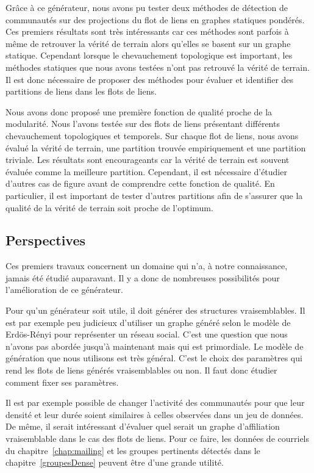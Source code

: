 \bigskip

Grâce à ce générateur, nous avons pu tester deux méthodes de détection de communautés sur des projections du flot de liens en graphes statiques pondérés.
Ces premiers résultats sont très intéressants car ces méthodes sont parfois à même de retrouver la vérité de terrain alors qu'elles se basent sur un graphe statique.
Cependant lorsque le chevauchement topologique est important, les méthodes statiques que nous avons testées n'ont pas retrouvé la vérité de terrain.
Il est donc nécessaire de proposer des méthodes pour évaluer et identifier des partitions de liens dans les flots de liens.

\bigskip

Nous avons donc proposé une première fonction de qualité proche de la modularité.
Nous l'avons testée sur des flots de liens présentant différents chevauchement topologiques et temporels.
Sur chaque flot de liens, nous avons évalué la vérité de terrain, une partition trouvée empiriquement et une partition triviale.
Les résultats sont encourageants car la vérité de terrain est souvent évaluée comme la meilleure partition.
Cependant, il est nécessaire d'étudier d'autres cas de figure avant de comprendre cette fonction de qualité.
En particulier, il est important de tester d'autres partitions afin de s'assurer que la qualité de la vérité de terrain soit proche de l'optimum.


\subsection{Perspectives}
Ces premiers travaux concernent un domaine qui n'a, à notre connaissance, jamais été étudié auparavant.
Il y a donc de nombreuses possibilités pour l'amélioration de ce générateur.


Pour qu'un générateur soit utile, il doit générer des structures vraisemblables.
Il est par exemple peu judicieux d'utiliser un graphe généré selon le modèle de Erdös-Rényi pour représenter un réseau social.
C'est une question que nous n'avons pas abordée jusqu'à maintenant mais qui est primordiale.
Le modèle de génération que nous utilisons est très général.
C'est le choix des paramètres qui rend les flots de liens générés vraisemblables ou non.
Il faut donc étudier comment fixer ses paramètres.

Il est par exemple possible de changer l'activité des communautés pour que leur densité et leur durée soient similaires à celles observées dans un jeu de données.
De même, il serait intéressant d'évaluer quel serait un graphe d'affiliation vraisemblable dans le cas des flots de liens.
Pour ce faire, les données de courriels du chapitre~\ref{chap:mailing} et les groupes pertinents détectés dans le chapitre~\ref{groupesDense} peuvent être d'une grande utilité.

